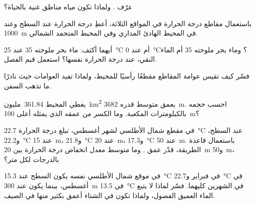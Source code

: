 \begin{exercise}[$\star$]\label{exo:g10:layered-ocean:2}
عرّف . ولماذا تكون مياه مناطق  غنية بالحياة؟
\end{exercise}

\begin{exercise}[$\star$]\label{exo:g10:layered-ocean:3}
باستعمال مقاطع درجة الحرارة في المواقع الثلاثة، أعطِ درجة الحرارة عند السطح وعند
\qty{1000}{m} في المحيط الهادئ المداري وفي المحيط المتجمد
الشمالي.
\end{exercise}

\begin{exercise}[$\star$]\label{exo:g10:layered-ocean:4}
أيهما أكثف: ماء بحر ملوحته 35 عند \qty{25}{\degreeCelsius} أم عند
\qty{0}{\degreeCelsius}؟ وماء بحر ملوحته 35 أم الماء النقي، عند درجة الحرارة
نفسها؟ استعمل قيم الفصل.
\end{exercise}

\begin{exercise}[$\star$]\label{exo:g10:layered-ocean:5}
فسّر كيف تقيس عوامة المقاطع مقطعًا رأسيًا للمحيط، ولماذا تفيد العوامات حيث نادرًا
ما تذهب السفن.
\end{exercise}

\begin{exercise}[$\star\star$]\label{exo:g10:layered-ocean:6}
يغطي المحيط \num{361.84}~مليون~\unit{km^2} بعمق متوسط قدره
\qty{3682}{m}. احسب حجمه بالكيلومترات المكعبة. وما الكسر من عمقه الذي يمثله
أعلى \qty{100}{m}؟
\end{exercise}

\begin{exercise}[$\star\star$]\label{exo:g10:layered-ocean:7}
في مقطع شمال الأطلسي لشهر أغسطس، تبلغ درجة الحرارة
\qty{22.7}{\degreeCelsius} عند السطح، و\qty{22.2}{\degreeCelsius} عند
\qty{15}{m}، و\qty{21.8}{\degreeCelsius} عند \qty{20}{m}،
و\qty{17.3}{\degreeCelsius} عند \qty{50}{m}. باستعمال قاعدة الطريقة، قدّر عمق
. وما متوسط معدل انخفاض درجة الحرارة بين \qty{20}{m} و\qty{50}{m}،
بالدرجات لكل متر؟
\end{exercise}

\begin{exercise}[$\star\star$]\label{exo:g10:layered-ocean:8}
في موقع شمال الأطلسي نفسه يكون السطح عند \qty{15.3}{\degreeCelsius}
في فبراير و\qty{22.7}{\degreeCelsius} في أغسطس، بينما يكون عند \qty{300}{m}
في \qty{13.5}{\degreeCelsius} في الشهرين كليهما. فسّر لماذا لا يتبع الماء العميق
الفصول، ولماذا تكون  في الشتاء أعمق بكثير منها في
الصيف.
\end{exercise}


